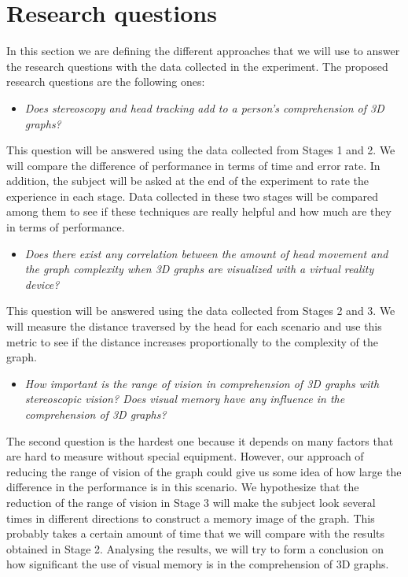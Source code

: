 \section{Research questions}\label{research-questions}

In this section we are defining the different approaches that we will
use to answer the research questions with the data collected in the
experiment. The proposed research questions are the following ones:

\begin{itemize}
\item
  \emph{Does stereoscopy and head tracking add to a person's
  comprehension of 3D graphs?}
\end{itemize}

This question will be answered using the data collected from Stages 1
and 2. We will compare the difference of performance in terms of time
and error rate. In addition, the subject will be asked at the end of the
experiment to rate the experience in each stage. Data collected in these
two stages will be compared among them to see if these techniques are
really helpful and how much are they in terms of performance.

\begin{itemize}
\item
  \emph{Does there exist any correlation between the amount of head
  movement and the graph complexity when 3D graphs are visualized with a
  virtual reality device?}
\end{itemize}

This question will be answered using the data collected from Stages 2
and 3. We will measure the distance traversed by the head for each
scenario and use this metric to see if the distance increases
proportionally to the complexity of the graph.

\begin{itemize}
\item
  \emph{How important is the range of vision in comprehension of 3D
  graphs with stereoscopic vision? Does visual memory have any influence
  in the comprehension of 3D graphs?}
\end{itemize}

The second question is the hardest one because it depends on many
factors that are hard to measure without special equipment. However, our
approach of reducing the range of vision of the graph could give us some
idea of how large the difference in the performance is in this scenario.
We hypothesize that the reduction of the range of vision in Stage 3 will
make the subject look several times in different directions to construct
a memory image of the graph. This probably takes a certain amount of
time that we will compare with the results obtained in Stage 2.
Analysing the results, we will try to form a conclusion on how
significant the use of visual memory is in the comprehension of 3D
graphs.

